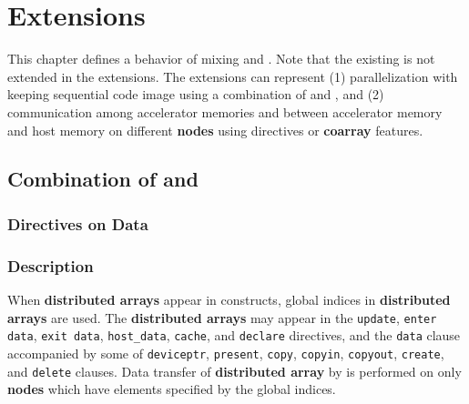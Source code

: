 \section{{\XMP} Extensions}\label{chap:xmp-ex}

This chapter defines a behavior of mixing {\XMP} and {\OACC}.
Note that the existing {\OACC} is not extended in the {\XMP} extensions.
The {\XMP} extensions can represent 
(1) parallelization with keeping sequential code image using a
combination of {\XMP} and {\OACC}, 
and
(2) communication among accelerator memories and between accelerator
memory and host memory on different {\bf nodes}
using {\XACC} directives or {\bf coarray} features.

\subsection{Combination of {\XMP} and {\OACC}}

\subsubsection{{\OACC} Directives on Data}

\subsubsection*{Description}

When {\bf distributed arrays} appear in {\OACC} constructs,
global indices in {\bf distributed arrays} are used.
The {\bf distributed arrays} may appear in the {\tt update}, {\tt enter data}, {\tt exit data}, 
{\tt host\_data}, {\tt cache}, and {\tt declare} directives,
and the {\tt data} clause accompanied by some of 
{\tt deviceptr}, {\tt present}, {\tt copy}, {\tt copyin}, 
{\tt copyout}, {\tt create}, and {\tt delete} clauses.
Data transfer of {\bf distributed array} by {\OACC} is performed on only {\bf nodes} which have elements specified by the global indices.

